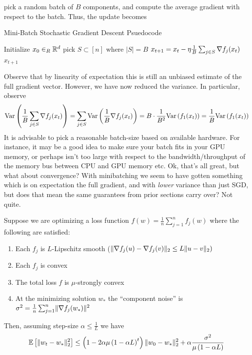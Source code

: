 pick a random batch of $B$ components, and compute the average gradient with respect to the batch. Thus, the update becomes
\begin{algorithm}[H]
    \caption{Mini-Batch Stochastic Gradient Descent Psuedocode}
    \label{algo:mini_batch_sgd}
    \begin{algorithmic}[1]
    \State Initialize $x_0 \in_R \mathbb{R}^d$
        \State pick $S \subset [n]$ where $|S| = B$
        \State $x_{t+1} = x_t - \eta \frac{1}{B} \sum_{j \in S} \nabla f_{j}(x_t)$
    \EndWhile
    \Return $x_{t+1}$
    \EndProcedure
    \end{algorithmic}
    \end{algorithm}
Observe that by linearity of expectation this is still an unbiased estimate of the full gradient vector.
However, we have now reduced the variance. In particular, observe
\begin{align*}
    \mathrm{Var}\left( \frac{1}{B} \sum_{j \in S} \nabla f_j(x_t) \right) = \sum_{j \in S} \mathrm{Var} \left( \frac{1}{B}\nabla f_j(x_t) \right) = B \cdot \frac{1}{B^2} \mathrm{Var} \left( f_1(x_t) \right) = \frac{1}{B} \mathrm{Var} \left( f_1(x_t) \right)
\end{align*}
It is advisable to pick a reasonable batch-size based on available hardware. For instance, it may be a good idea to make sure your batch fits
in your GPU memory, or perhaps isn't too large with respect to the bandwidth/throughput of the memory bus between CPU and GPU memory etc. 
Ok, that's all great, but what about convergence? With minibatching we seem to have gotten something which is on expectation the full gradient, and
with {\em lower} variance than just SGD, but does that mean the same guarantees from prior sections carry over? Not quite.

\begin{theorem}
    Suppose we are optimizing a loss function $f(w) = \frac{1}{n} \sum_{j = 1}^n f_j(w)$ where the following are satisfied:
    \begin{enumerate}
        \item Each $f_j$ is $L$-Lipschitz smooth ($\lVert \nabla f_j(u) - \nabla f_j(v) \rVert_2 \leq L \lVert u - v \rVert_2)$
        \item Each $f_j$ is convex
        \item The total loss $f$ is $\mu$-strongly convex
        \item At the minimizing solution $w_*$ the ``component noise'' is $\sigma^2 = \frac{1}{n} \sum_{j = 1}^n \lVert \nabla f_j(w_*) \rVert^2$
    \end{enumerate}
    Then, assuming step-size $\alpha \leq \frac{1}{L}$ we have
    \begin{align*}
        \mathbb{E}\left[ \lVert w_t - w_* \rVert_2^2 \right] \leq \left(1 - 2\alpha\mu\left(1 - \alpha L\right)^t\right) \lVert w_0 - w_* \rVert_2^2 + \alpha \frac{\sigma^2}{\mu \left(1 - \alpha L\right)}
    \end{align*}
\end{theorem}

